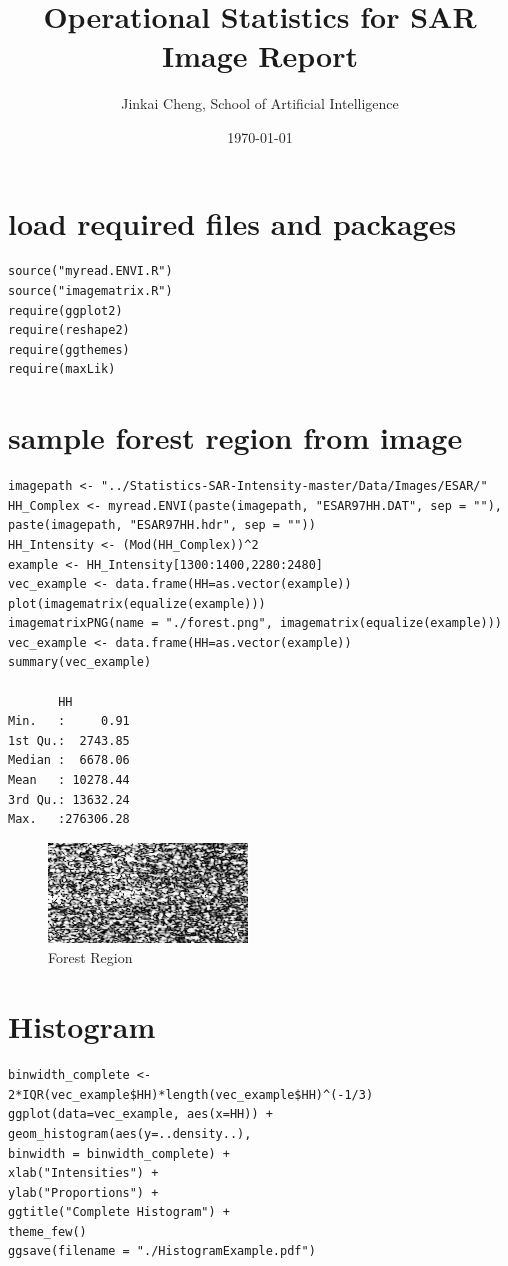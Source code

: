 \documentclass{article}
\title{Operational Statistics for SAR Image Report}
\author{Jinkai Cheng, School of Artificial Intelligence}
\date\today
\begin{document}
\maketitle
\section{load required files and packages}
\begin{lstlisting}[frame=tb]
source("myread.ENVI.R")
source("imagematrix.R")
require(ggplot2)
require(reshape2)
require(ggthemes)
require(maxLik)
\end{lstlisting}

\section{sample forest region from image}
\begin{lstlisting}[frame=tb]
imagepath <- "../Statistics-SAR-Intensity-master/Data/Images/ESAR/"
HH_Complex <- myread.ENVI(paste(imagepath, "ESAR97HH.DAT", sep = ""),
paste(imagepath, "ESAR97HH.hdr", sep = ""))
HH_Intensity <- (Mod(HH_Complex))^2
example <- HH_Intensity[1300:1400,2280:2480]
vec_example <- data.frame(HH=as.vector(example))
plot(imagematrix(equalize(example)))
imagematrixPNG(name = "./forest.png", imagematrix(equalize(example)))
vec_example <- data.frame(HH=as.vector(example))
summary(vec_example)

       HH           
Min.   :     0.91  
1st Qu.:  2743.85  
Median :  6678.06  
Mean   : 10278.44  
3rd Qu.: 13632.24  
Max.   :276306.28 
\end{lstlisting}

\begin{figure}[htb]
	\centering
	\includegraphics[width=0.5\linewidth]{forest.png}
	\caption{Forest Region}
	\label{fig:forest}
\end{figure}



\section{Histogram}
\begin{lstlisting}[frame=tb]
binwidth_complete <- 2*IQR(vec_example$HH)*length(vec_example$HH)^(-1/3)
ggplot(data=vec_example, aes(x=HH)) + 
geom_histogram(aes(y=..density..), 
binwidth = binwidth_complete) + 
xlab("Intensities") +
ylab("Proportions") +
ggtitle("Complete Histogram") +
theme_few()
ggsave(filename = "./HistogramExample.pdf")
\end{lstlisting}
\end{document}
